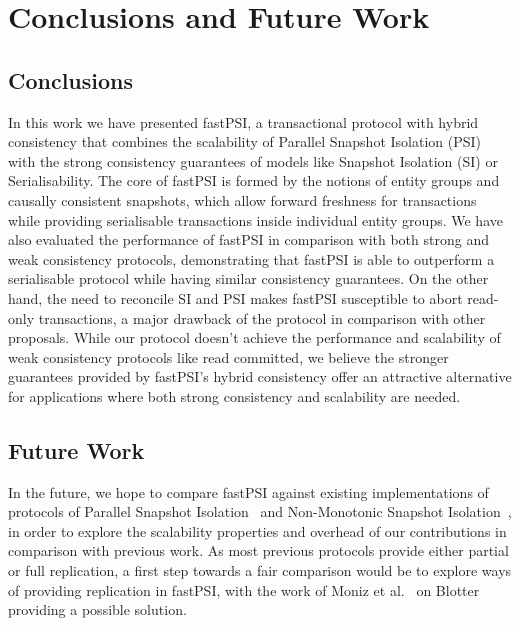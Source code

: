 \cleardoublepage
\chapter{Conclusions and Future Work}
\label{chapter:conclusion}

\section{Conclusions}

In this work we have presented fastPSI, a transactional protocol with hybrid consistency that combines the scalability of Parallel Snapshot Isolation (PSI) with the strong consistency guarantees of models like Snapshot Isolation (SI) or Serialisability. The core of fastPSI is formed by the notions of entity groups and causally consistent snapshots, which allow forward freshness for transactions while providing serialisable transactions inside individual entity groups. We have also evaluated the performance of fastPSI in comparison with both strong and weak consistency protocols, demonstrating that fastPSI is able to outperform a serialisable protocol while having similar consistency guarantees. On the other hand, the need to reconcile SI and PSI makes fastPSI susceptible to abort read-only transactions, a major drawback of the protocol in comparison with other proposals. While our protocol doesn't achieve the performance and scalability of weak consistency protocols like read committed, we believe the stronger guarantees provided by fastPSI's hybrid consistency offer an attractive alternative for applications where both strong consistency and scalability are needed.

\section{Future Work}

In the future, we hope to compare fastPSI against existing implementations of protocols of Parallel Snapshot Isolation~\citep{psi-intro} and Non-Monotonic Snapshot Isolation~\citep{ardekani_nmsi, moniz_blotter}, in order to explore the scalability properties and overhead of our contributions in comparison with previous work. As most previous protocols provide either partial or full replication, a first step towards a fair comparison would be to explore ways of providing replication in fastPSI, with the work of Moniz et al.~\citep{moniz_blotter} on Blotter providing a possible solution.

